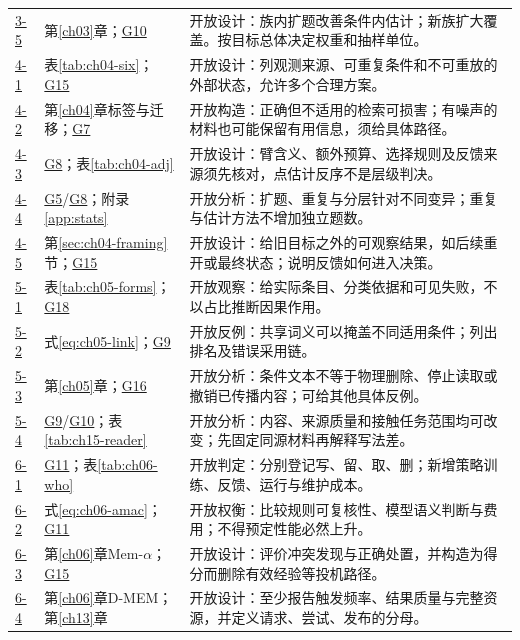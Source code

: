 \begin{small}
\begin{longtable}{@{}p{1.1cm}p{4.1cm}p{10.1cm}@{}}
\hyperref[ex:ch03-5]{3-5} & 第\ref{ch03}章；\hyperref[sol:g10]{G10} & 开放设计：族内扩题改善条件内估计；新族扩大覆盖。按目标总体决定权重和抽样单位。 \\
\hyperref[ex:ch04-1]{4-1} & 表\ref{tab:ch04-six}；\hyperref[sol:g15]{G15} & 开放设计：列观测来源、可重复条件和不可重放的外部状态，允许多个合理方案。 \\
\hyperref[ex:ch04-2]{4-2} & 第\ref{ch04}章标签与迁移；\hyperref[sol:g07]{G7} & 开放构造：正确但不适用的检索可损害；有噪声的材料也可能保留有用信息，须给具体路径。 \\
\hyperref[ex:ch04-3]{4-3} & \hyperref[sol:g08]{G8}；表\ref{tab:ch04-adj} & 开放设计：臂含义、额外预算、选择规则及反馈来源须先核对，点估计反序不是层级判决。 \\
\hyperref[ex:ch04-4]{4-4} & \hyperref[sol:g05]{G5}/\hyperref[sol:g08]{G8}；附录\ref{app:stats} & 开放分析：扩题、重复与分层针对不同变异；重复与估计方法不增加独立题数。 \\
\hyperref[ex:ch04-5]{4-5} & 第\ref{sec:ch04-framing}节；\hyperref[sol:g15]{G15} & 开放设计：给旧目标之外的可观察结果，如后续重开或最终状态；说明反馈如何进入决策。 \\
\hyperref[ex:ch05-1]{5-1} & 表\ref{tab:ch05-forms}；\hyperref[sol:g18]{G18} & 开放观察：给实际条目、分类依据和可见失败，不以占比推断因果作用。 \\
\hyperref[ex:ch05-2]{5-2} & 式\eqref{eq:ch05-link}；\hyperref[sol:g09]{G9} & 开放反例：共享词义可以掩盖不同适用条件；列出排名及错误采用链。 \\
\hyperref[ex:ch05-3]{5-3} & 第\ref{ch05}章；\hyperref[sol:g16]{G16} & 开放分析：条件文本不等于物理删除、停止读取或撤销已传播内容；可给其他具体反例。 \\
\hyperref[ex:ch05-4]{5-4} & \hyperref[sol:g09]{G9}/\hyperref[sol:g10]{G10}；表\ref{tab:ch15-reader} & 开放分析：内容、来源质量和接触任务范围均可改变；先固定同源材料再解释写法差。 \\
\hyperref[ex:ch06-1]{6-1} & \hyperref[sol:g11]{G11}；表\ref{tab:ch06-who} & 开放判定：分别登记写、留、取、删；新增策略训练、反馈、运行与维护成本。 \\
\hyperref[ex:ch06-2]{6-2} & 式\eqref{eq:ch06-amac}；\hyperref[sol:g11]{G11} & 开放权衡：比较规则可复核性、模型语义判断与费用；不得预定性能必然上升。 \\
\hyperref[ex:ch06-3]{6-3} & 第\ref{ch06}章Mem-$\alpha$；\hyperref[sol:g15]{G15} & 开放设计：评价冲突发现与正确处置，并构造为得分而删除有效经验等投机路径。 \\
\hyperref[ex:ch06-4]{6-4} & 第\ref{ch06}章D-MEM；第\ref{ch13}章 & 开放设计：至少报告触发频率、结果质量与完整资源，并定义请求、尝试、发布的分母。 \\

\end{longtable}
\end{small}
